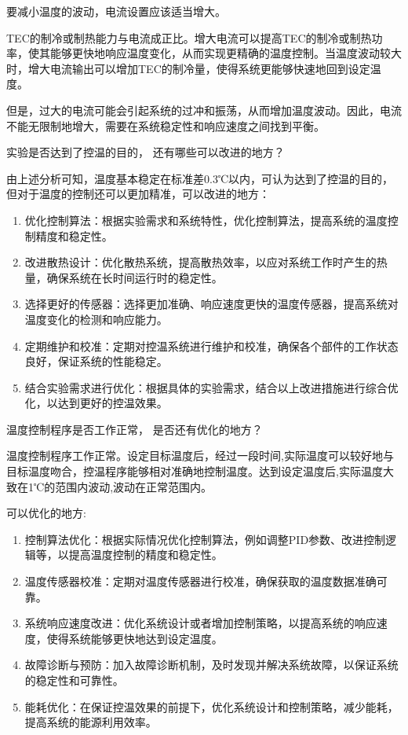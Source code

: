 \documentclass[dvipsnames, svgnames,a4paper,11pt]{article}
\begin{document}
    要减小温度的波动，电流设置应该适当增大。
    
    TEC的制冷或制热能力与电流成正比。增大电流可以提高TEC的制冷或制热功率，使其能够更快地响应温度变化，从而实现更精确的温度控制。当温度波动较大时，增大电流输出可以增加TEC的制冷量，使得系统更能够快速地回到设定温度。

    但是，过大的电流可能会引起系统的过冲和振荡，从而增加温度波动。因此，电流不能无限制地增大，需要在系统稳定性和响应速度之间找到平衡。
    



    \begin{question}
        实验是否达到了控温的目的， 还有哪些可以改进的地方？
    \end{question}

        由上述分析可知，温度基本稳定在标准差0.3℃以内，可认为达到了控温的目的，但对于温度的控制还可以更加精准，可以改进的地方：

        \begin{enumerate}
            \item 优化控制算法：根据实验需求和系统特性，优化控制算法，提高系统的温度控制精度和稳定性。
            \item 改进散热设计：优化散热系统，提高散热效率，以应对系统工作时产生的热量，确保系统在长时间运行时的稳定性。
            \item 选择更好的传感器：选择更加准确、响应速度更快的温度传感器，提高系统对温度变化的检测和响应能力。
            \item 定期维护和校准：定期对控温系统进行维护和校准，确保各个部件的工作状态良好，保证系统的性能稳定。
            \item 结合实验需求进行优化：根据具体的实验需求，结合以上改进措施进行综合优化，以达到更好的控温效果。
        \end{enumerate}






    \begin{question}
        温度控制程序是否工作正常， 是否还有优化的地方？
    \end{question}

    温度控制程序工作正常。设定目标温度后，经过一段时间,实际温度可以较好地与目标温度吻合，控温程序能够相对准确地控制温度。达到设定温度后,实际温度大致在1℃的范围内波动,波动在正常范围内。

    可以优化的地方:

        \begin{enumerate}
            \item 控制算法优化：根据实际情况优化控制算法，例如调整PID参数、改进控制逻辑等，以提高温度控制的精度和稳定性。
            \item 温度传感器校准：定期对温度传感器进行校准，确保获取的温度数据准确可靠。
            \item 系统响应速度改进：优化系统设计或者增加控制策略，以提高系统的响应速度，使得系统能够更快地达到设定温度。
            \item 故障诊断与预防：加入故障诊断机制，及时发现并解决系统故障，以保证系统的稳定性和可靠性。
            \item 能耗优化：在保证控温效果的前提下，优化系统设计和控制策略，减少能耗，提高系统的能源利用效率。
        \end{enumerate}
\end{document}
